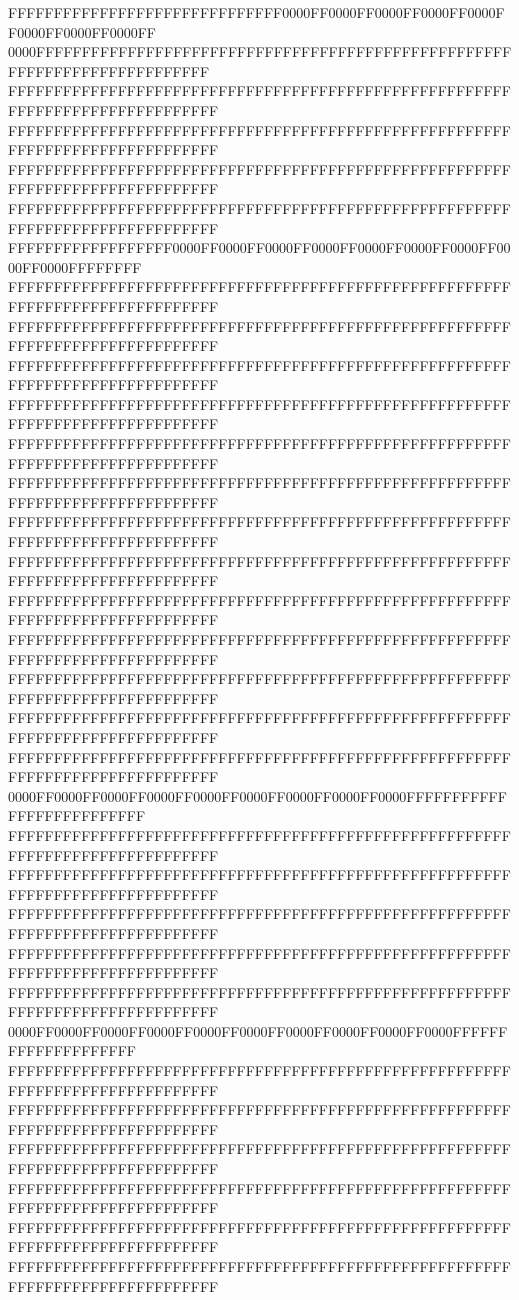 FFFFFFFFFFFFFFFFFFFFFFFFFFFFFF0000FF0000FF0000FF0000FF0000FF0000FF0000FF0000FF
0000FFFFFFFFFFFFFFFFFFFFFFFFFFFFFFFFFFFFFFFFFFFFFFFFFFFFFFFFFFFFFFFFFFFFFFFFFF
FFFFFFFFFFFFFFFFFFFFFFFFFFFFFFFFFFFFFFFFFFFFFFFFFFFFFFFFFFFFFFFFFFFFFFFFFFFFFF
FFFFFFFFFFFFFFFFFFFFFFFFFFFFFFFFFFFFFFFFFFFFFFFFFFFFFFFFFFFFFFFFFFFFFFFFFFFFFF
FFFFFFFFFFFFFFFFFFFFFFFFFFFFFFFFFFFFFFFFFFFFFFFFFFFFFFFFFFFFFFFFFFFFFFFFFFFFFF
FFFFFFFFFFFFFFFFFFFFFFFFFFFFFFFFFFFFFFFFFFFFFFFFFFFFFFFFFFFFFFFFFFFFFFFFFFFFFF
FFFFFFFFFFFFFFFFFF0000FF0000FF0000FF0000FF0000FF0000FF0000FF0000FF0000FFFFFFFF
FFFFFFFFFFFFFFFFFFFFFFFFFFFFFFFFFFFFFFFFFFFFFFFFFFFFFFFFFFFFFFFFFFFFFFFFFFFFFF
FFFFFFFFFFFFFFFFFFFFFFFFFFFFFFFFFFFFFFFFFFFFFFFFFFFFFFFFFFFFFFFFFFFFFFFFFFFFFF
FFFFFFFFFFFFFFFFFFFFFFFFFFFFFFFFFFFFFFFFFFFFFFFFFFFFFFFFFFFFFFFFFFFFFFFFFFFFFF
FFFFFFFFFFFFFFFFFFFFFFFFFFFFFFFFFFFFFFFFFFFFFFFFFFFFFFFFFFFFFFFFFFFFFFFFFFFFFF
FFFFFFFFFFFFFFFFFFFFFFFFFFFFFFFFFFFFFFFFFFFFFFFFFFFFFFFFFFFFFFFFFFFFFFFFFFFFFF
FFFFFFFFFFFFFFFFFFFFFFFFFFFFFFFFFFFFFFFFFFFFFFFFFFFFFFFFFFFFFFFFFFFFFFFFFFFFFF
FFFFFFFFFFFFFFFFFFFFFFFFFFFFFFFFFFFFFFFFFFFFFFFFFFFFFFFFFFFFFFFFFFFFFFFFFFFFFF
FFFFFFFFFFFFFFFFFFFFFFFFFFFFFFFFFFFFFFFFFFFFFFFFFFFFFFFFFFFFFFFFFFFFFFFFFFFFFF
FFFFFFFFFFFFFFFFFFFFFFFFFFFFFFFFFFFFFFFFFFFFFFFFFFFFFFFFFFFFFFFFFFFFFFFFFFFFFF
FFFFFFFFFFFFFFFFFFFFFFFFFFFFFFFFFFFFFFFFFFFFFFFFFFFFFFFFFFFFFFFFFFFFFFFFFFFFFF
FFFFFFFFFFFFFFFFFFFFFFFFFFFFFFFFFFFFFFFFFFFFFFFFFFFFFFFFFFFFFFFFFFFFFFFFFFFFFF
FFFFFFFFFFFFFFFFFFFFFFFFFFFFFFFFFFFFFFFFFFFFFFFFFFFFFFFFFFFFFFFFFFFFFFFFFFFFFF
FFFFFFFFFFFFFFFFFFFFFFFFFFFFFFFFFFFFFFFFFFFFFFFFFFFFFFFFFFFFFFFFFFFFFFFFFFFFFF
0000FF0000FF0000FF0000FF0000FF0000FF0000FF0000FF0000FFFFFFFFFFFFFFFFFFFFFFFFFF
FFFFFFFFFFFFFFFFFFFFFFFFFFFFFFFFFFFFFFFFFFFFFFFFFFFFFFFFFFFFFFFFFFFFFFFFFFFFFF
FFFFFFFFFFFFFFFFFFFFFFFFFFFFFFFFFFFFFFFFFFFFFFFFFFFFFFFFFFFFFFFFFFFFFFFFFFFFFF
FFFFFFFFFFFFFFFFFFFFFFFFFFFFFFFFFFFFFFFFFFFFFFFFFFFFFFFFFFFFFFFFFFFFFFFFFFFFFF
FFFFFFFFFFFFFFFFFFFFFFFFFFFFFFFFFFFFFFFFFFFFFFFFFFFFFFFFFFFFFFFFFFFFFFFFFFFFFF
FFFFFFFFFFFFFFFFFFFFFFFFFFFFFFFFFFFFFFFFFFFFFFFFFFFFFFFFFFFFFFFFFFFFFFFFFFFFFF
0000FF0000FF0000FF0000FF0000FF0000FF0000FF0000FF0000FF0000FFFFFFFFFFFFFFFFFFFF
FFFFFFFFFFFFFFFFFFFFFFFFFFFFFFFFFFFFFFFFFFFFFFFFFFFFFFFFFFFFFFFFFFFFFFFFFFFFFF
FFFFFFFFFFFFFFFFFFFFFFFFFFFFFFFFFFFFFFFFFFFFFFFFFFFFFFFFFFFFFFFFFFFFFFFFFFFFFF
FFFFFFFFFFFFFFFFFFFFFFFFFFFFFFFFFFFFFFFFFFFFFFFFFFFFFFFFFFFFFFFFFFFFFFFFFFFFFF
FFFFFFFFFFFFFFFFFFFFFFFFFFFFFFFFFFFFFFFFFFFFFFFFFFFFFFFFFFFFFFFFFFFFFFFFFFFFFF
FFFFFFFFFFFFFFFFFFFFFFFFFFFFFFFFFFFFFFFFFFFFFFFFFFFFFFFFFFFFFFFFFFFFFFFFFFFFFF
FFFFFFFFFFFFFFFFFFFFFFFFFFFFFFFFFFFFFFFFFFFFFFFFFFFFFFFFFFFFFFFFFFFFFFFFFFFFFF
